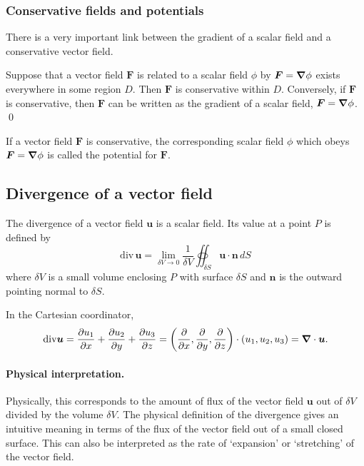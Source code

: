 \subsubsection{Conservative fields and potentials}
There is a very important link between the gradient of a scalar field and a conservative vector field.

\begin{theorem}
    Suppose that a vector field $\bm{F}$ is related to a scalar field $\phi$ by $ \bm{F}=\bm{\nabla} \phi $ exists everywhere in some region $D$. 
    Then $\bm{F}$ is conservative within $D$. 
    Conversely, if $\bm{F}$ is conservative, then $\bm{F}$ can be written as the gradient of a scalar field, 
    $ \bm{F}=\bm{\nabla} \phi $.
    \qed
\end{theorem}

If a vector field $\bm{F}$ is conservative, the corresponding scalar field $\phi$ which obeys $ \bm{F}=\bm{\nabla} \phi $ is called the potential for $\bm{F}$.

\subsection{Divergence of a vector field}
The divergence of a vector field $\bm{u}$ is a scalar field. 
Its value at a point $P$ is defined by 
\begin{equation}
    \mathrm{div} \,\bm{u}=\lim _{\delta V \to 0} 
    \frac{1}{\delta V} \oiint_{\delta S} \bm{u} \cdot \bm{n} \,d S
\end{equation}
where $\delta V$ is a small volume enclosing $P$ with surface $\delta S$ and $\bm{n}$ is the outward pointing normal to $\delta S$. 

In the Cartesian coordinator, 
\begin{equation}
    \begin{aligned}
        \mathrm{div} \bm{u}
        =\frac{\partial u_{1}}{\partial x}+\frac{\partial u_{2}}{\partial y}+\frac{\partial u_{3}}{\partial z}
        = \left(\frac{\partial}{\partial x}, \frac{\partial}{\partial y}, \frac{\partial}{\partial z}\right) \cdot\left(u_{1}, u_{2}, u_{3}\right)
        = \bm{\nabla} \cdot \bm{u}.
    \end{aligned}
\end{equation}

\paragraph{Physical interpretation. }
Physically, this corresponds to the amount of flux of the vector field $\bm{u}$ out of $\delta V$ divided by the volume $\delta V$. 
The physical definition of the divergence gives an intuitive meaning in terms of the flux of the vector field out of a small closed surface. 
This can also be interpreted as the rate of `expansion' or `stretching' of the vector field. 

